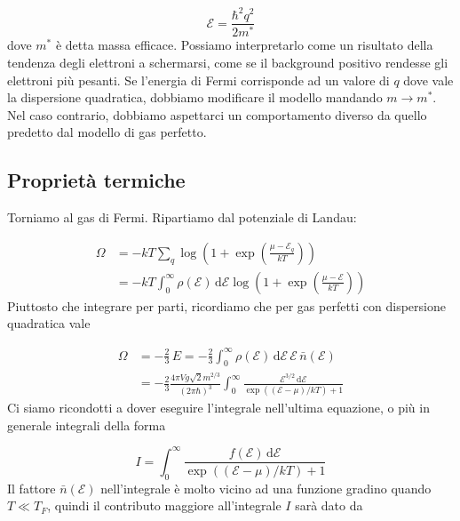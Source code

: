 \documentclass[a4paper]{report}
\begin{document}
\begin{equation}
    \mathcal{E} = \frac{\hbar^2 q^2}{2m^{*}}
\end{equation}
dove $m^{*}$ è detta massa efficace. Possiamo interpretarlo come un risultato della tendenza degli elettroni a schermarsi, come se il background positivo rendesse gli elettroni più pesanti. Se l'energia di Fermi corrisponde ad un valore di $q$ dove vale la dispersione quadratica, dobbiamo modificare il modello mandando $m\to m^{*}$. Nel caso contrario, dobbiamo aspettarci un comportamento diverso da quello predetto dal modello di gas perfetto. 

\subsection{Proprietà termiche}
Torniamo al gas di Fermi. Ripartiamo dal potenziale di Landau:

\begin{equation}
    \begin{split}
        \Omega & = - k T \sum_q \log \left(1+ \exp \left(\frac{\mu-\mathcal{E}_q}{k T}\right)\right)\\
        & = - k T \int_{0}^{\infty} \rho(\mathcal{E})\,\mathrm{d}\mathcal{E}  \log \left(1+ \exp \left(\frac{\mu-\mathcal{E}}{k T}\right)\right)
    \end{split}
\end{equation}
Piuttosto che integrare per parti, ricordiamo che per gas perfetti con dispersione quadratica vale

\begin{equation}
    \begin{split}
        \Omega & = -\frac{2}{3}\,E = -\frac{2}{3}\int_{0}^{\infty}\rho(\mathcal{E})\,\mathrm{d}\mathcal{E} \,\mathcal{E}\,\bar{n}(\mathcal{E}) \\
        & = - \frac{2}{3}\frac{4\pi V g \sqrt{2} m^{2/3}}{(2\pi\hbar)^3} \int_{0}^{\infty}\frac{\mathcal{E}^{3/2}\,\mathrm{d}\mathcal{E}}{\exp((\mathcal{E}-\mu)/k T)+1}
    \end{split}
\end{equation}
Ci siamo ricondotti a dover eseguire l'integrale nell'ultima equazione, o più in generale integrali della forma

\begin{equation}
    I = \int_{0}^{\infty}\frac{f(\mathcal{E})\,\mathrm{d}\mathcal{E}}{\exp((\mathcal{E}-\mu)/k T)+1}
\end{equation}
Il fattore $\bar{n}(\mathcal{E})$ nell'integrale è molto vicino ad una funzione gradino quando $T\ll T_F$, quindi il contributo maggiore all'integrale $I$ sarà dato da
\end{document}
